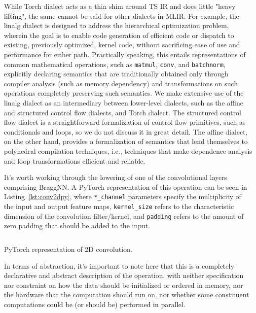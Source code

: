 While Torch dialect acts as a thin shim around TS IR and does little "heavy lifting", the same cannot be said for other dialects in MLIR.
For example, the linalg dialect is designed to address the hierarchical optimization problem, wherein the goal is to enable code generation of efficient code or dispatch to existing, previously optimized, kernel code, without sacrificing ease of use and performance for either path.
Practically speaking, this entails representations of common mathematical operations, such as \texttt{matmul}, \texttt{conv}, and \texttt{batchnorm}, explicitly declaring semantics that are traditionally obtained only through compiler analysis (such as memory dependency) and transformations on such operations completely preserving such semantics.
We make extensive use of the linalg dialect as an intermediary between lower-level dialects, such as the affine and structured control flow dialects, and Torch dialect.
The structured control flow dialect is a straightforward formalization of control flow primitives, such as conditionals and loops, so we do not discuss it in great detail.
The affine dialect, on the other hand, provides a formalization of semantics that lend themselves to polyhedral compilation techniques\cite{polyhedral-mlir}, i.e., techniques that make dependence analysis and loop transformations efficient and reliable.

It's worth working through the lowering of one of the convolutional layers comprising BraggNN.
A PyTorch representation of this operation can be seen in Listing~\ref{lst:conv2dpy}, where \texttt{*_channel} parameters specify the multiplicity of the input and output feature maps, \texttt{kernel_size} refers to the characteristic dimension of the convolution filter/kernel, and \texttt{padding} refers to the amount of zero padding that should be added to the input.
\begin{longlisting}
	\inputminted{python}{sources/conv2d.py}
	\caption{PyTorch representation of 2D convolution.}
	\label{lst:conv2dpy}
\end{longlisting}
In terms of abstraction, it's important to note here that this is a completely declarative and abstract description of the operation, with neither specification nor constraint on how the data should be initialized or ordered in memory, nor the hardware that the computation should run on, nor whether some constituent computations could be (or should be) performed in parallel.

